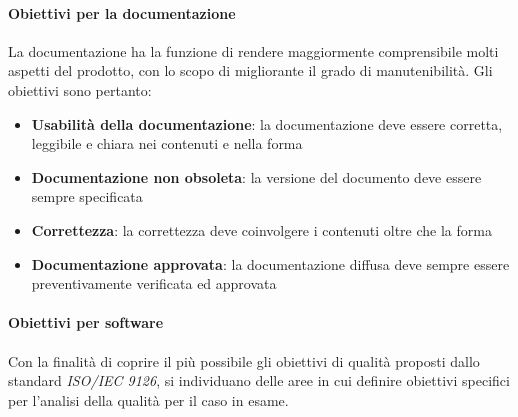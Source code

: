 \documentclass[12pt,a4paper]{article}
\begin{document}
\paragraph{Obiettivi per la documentazione}
La documentazione ha la funzione di rendere maggiormente comprensibile molti aspetti del prodotto, con lo scopo di migliorante il grado di manutenibilità. Gli obiettivi sono pertanto:
\begin{itemize}
	\item\textbf{Usabilità della documentazione}: la documentazione deve essere corretta, leggibile e chiara nei contenuti e nella forma
	\item\textbf{Documentazione non obsoleta}: la versione del documento deve essere sempre specificata
	\item\textbf{Correttezza}: la correttezza deve coinvolgere i contenuti oltre che la forma
	\item\textbf{Documentazione approvata}: la documentazione diffusa deve sempre essere preventivamente verificata ed approvata
\end{itemize}

\paragraph{Obiettivi per software}
Con la finalità di coprire il più possibile gli obiettivi di qualità proposti dallo standard \textit{ISO/IEC 9126}, si individuano delle aree in cui definire obiettivi specifici per l'analisi della qualità  per il caso in esame.
\end{document}
